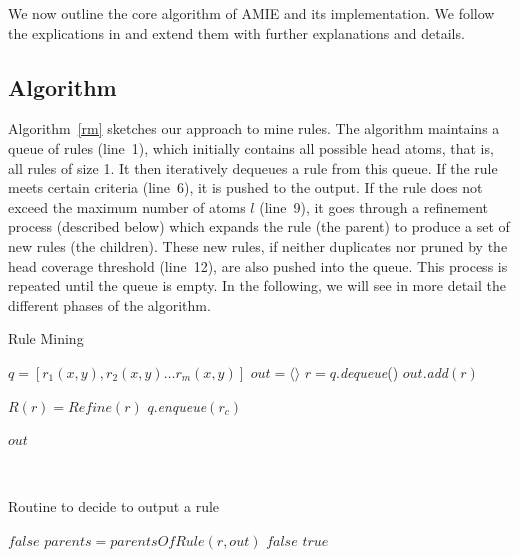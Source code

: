 
We now outline the core algorithm of AMIE and its implementation.
We follow the explications in \cite{amie} and extend them with further explanations and details.

\subsection{Algorithm}
\label{subsec:algorithm}

Algorithm~\ref{rm} sketches our approach to mine rules. 
The algorithm maintains a queue of rules (line~1), which initially contains all possible head atoms, that is, all rules of size 1.
It then iteratively dequeues a rule from this queue.
If the rule meets certain criteria (line~6), it is pushed to the output.
If the rule does not exceed the maximum number of atoms $l$ (line~9), it goes through a refinement process (described below) which
expands the rule (the parent) to produce a set of new rules (the children). These new rules, 
if neither duplicates nor pruned by the head coverage threshold (line~12),  
are also pushed into the queue.
This process is repeated until the queue is empty. 
In the following, we will see in more detail the different phases of the algorithm.





\begin{algorithm}
\caption{Rule Mining}
\label{rm}
\begin{algorithmic}[1]
    \State $q = [r_1(x,y), r_2(x,y) \dots r_m(x,y)] $
    \State $out = \langle \rangle$
	  \State $r = q.$\emph{dequeue}()
	      \State $out.$\emph{add}$(r)$	
	  \EndIf
	  
	    \State $R(r) = Refine(r)$	    
			\State $q.$\emph{enqueue}$(r_c)$		      
		    \EndIf
	    \EndFor
	    
	  \EndIf  
	  
	\EndWhile
    \State \Return $out$
\EndFunction
\end{algorithmic}
\end{algorithm}
\ \\[-1cm]
\begin{algorithm}
\caption{Routine to decide to output a rule}
\label{pfo}
\begin{algorithmic}[1]
      \State \Return $false$
    \EndIf 
    \State $parents = parentsOfRule(r, out)$
	\State \Return $false$
      \EndIf
    \EndFor
    \State \Return $true$
\EndFunction
\end{algorithmic}
\end{algorithm}

